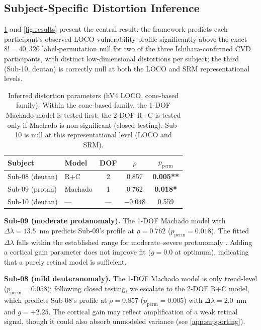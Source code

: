 \documentclass{article}
\begin{document}
\subsection{Subject-Specific Distortion Inference}

\cref{tab:main} and \cref{fig:results} present the central result: the framework predicts each participant's observed LOCO vulnerability profile significantly above the exact $8! = 40{,}320$ label-permutation null for two of the three Ishihara-confirmed CVD participants, with distinct low-dimensional distortions per subject; the third (Sub-10, deutan) is correctly null at both the LOCO and SRM representational levels.

\begin{table}[t]
  \caption{Inferred distortion parameters (hV4 LOCO, cone-based family). Within the cone-based family, the 1-DOF Machado model is tested first; the 2-DOF R+C is tested only if Machado is non-significant (closed testing). Sub-10 is null at this representational level (LOCO and SRM).}
  \label{tab:main}
  \begin{center}
    \begin{small}
      \begin{tabular}{llccc}
        \toprule
        Subject & Model & DOF & $\rho$ & $p_{\text{perm}}$ \\
        \midrule
        Sub-08 (deutan) & R+C & 2 & 0.857 & \textbf{0.005**} \\
        Sub-09 (protan) & Machado & 1 & 0.762 & \textbf{0.018*} \\
        Sub-10 (deutan) & --- & --- & $-0.048$ & 0.559 \\
        \bottomrule
      \end{tabular}
    \end{small}
  \end{center}
  \vskip -0.15in
\end{table}

\textbf{Sub-09 (moderate protanomaly).}
The 1-DOF Machado model with $\Delta\lambda = 13.5$~nm predicts Sub-09's profile at $\rho = 0.762$ ($p_{\text{perm}} = 0.018$).
The fitted $\Delta\lambda$ falls within the established range for moderate--severe protanomaly \citep{machado2009}.
Adding a cortical gain parameter does not improve fit ($g = 0.0$ at optimum), indicating that a purely retinal model is sufficient.

\textbf{Sub-08 (mild deuteranomaly).}
The 1-DOF Machado model is only trend-level ($p_{\text{perm}} = 0.058$); following closed testing, we escalate to the 2-DOF R+C model, which predicts Sub-08's profile at $\rho = 0.857$ ($p_{\text{perm}} = 0.005$) with $\Delta\lambda = 2.0$~nm and $g = +2.25$.
The cortical gain may reflect amplification of a weak retinal signal, though it could also absorb unmodeled variance (see \cref{app:supporting}).
\end{document}
